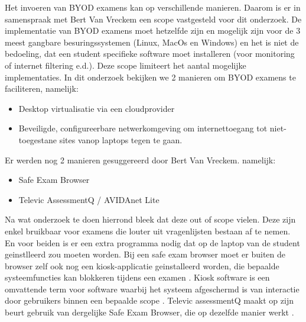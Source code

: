 Het invoeren van BYOD examens kan op verschillende manieren. Daarom is er in samenspraak met Bert Van Vreckem een scope vastgesteld voor dit onderzoek. De implementatie van BYOD examens moet hetzelfde zijn en mogelijk zijn voor de 3 meest gangbare besuringssystemen (Linux, MacOs en Windows) en het is niet de bedoeling, dat een student specifieke software moet installeren (voor monitoring of internet filtering e.d.). Deze scope limiteert het aantal mogelijke implementaties. In dit onderzoek bekijken we 2 manieren om BYOD examens te faciliteren, namelijk:

\begin{itemize} 
\item Desktop virtualisatie via een cloudprovider
\item Beveiligde, configureerbare netwerkomgeving om internettoegang tot niet-toegestane sites vanop laptops tegen te gaan.	
\end{itemize}

Er werden nog 2 manieren gesuggereerd door Bert Van Vreckem. namelijk:  
\begin{itemize}
	\item Safe Exam Browser 
	\item Televic AssessmentQ / AVIDAnet Lite
\end{itemize}

Na wat onderzoek te doen hierrond bleek dat deze out of scope vielen. Deze zijn enkel bruikbaar voor examens die louter uit vragenlijsten bestaan af te nemen. En voor beiden is er een extra programma nodig dat op de laptop van de student geinstlleerd zou moeten worden. Bij een safe exam browser moet er buiten de browser zelf ook nog een kiosk-applicatie geinstalleerd worden, die bepaalde systeemfuncties kan blokkeren tijdens een examen \autocite{SEB2019}. Kiosk software is een omvattende term voor software waarbij het systeem afgeschermd is van interactie door gebruikers binnen een bepaalde scope \autocite{Kio2009}. Televic assessmentQ maakt op zijn beurt gebruik van dergelijke Safe Exam Browser, die op dezelfde manier werkt \autocite{Tele2019}. 





